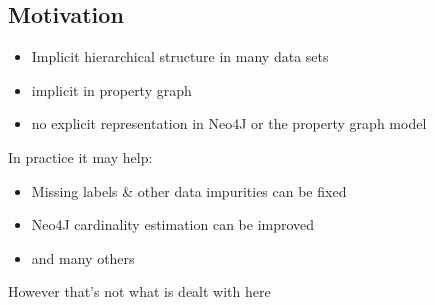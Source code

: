 \documentclass[rgb]{beamer}
\begin{document}
    \subsection{Motivation}
        \begin{frame}[allowframebreaks]
        \subsectionpage
        \begin{itemize}
            \item Implicit hierarchical structure in many data sets
            \item implicit in property graph
            \item no explicit representation in Neo4J or the property graph model
        \end{itemize}        
        \vspace{0.8cm}
        In practice it may help:
        \vspace{0.8cm}
            \begin{itemize}
                \item Missing labels \& other data impurities can be fixed
                \item Neo4J cardinality estimation can be improved
                \item and many others
            \end{itemize}{}
            \vspace{0.8cm}
            However that's not what is dealt with here
        \end{frame}
        
\end{document}
